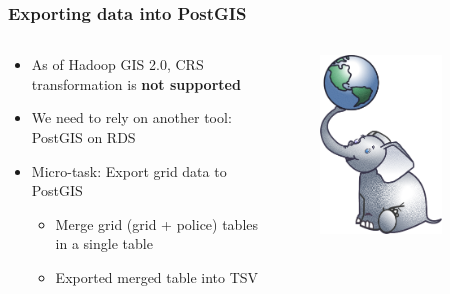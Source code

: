 \documentclass[hyperref={pdfpagelabels=true}]{beamer}
\begin{document}
\begin{frame}
\frametitle{Exporting data into PostGIS}
\begin{columns}
  \begin{column}{0.5\textwidth}
    \begin{itemize}
      \item<1->As of Hadoop GIS 2.0, CRS transformation is \textbf{not supported}
      \item<1->We need to rely on another tool: PostGIS on RDS  
      \item<1->Micro-task: Export grid data to PostGIS
      \begin{itemize}
	\item<2->Merge grid (grid + police) tables in a single table
	\item<3->Exported merged table into TSV
      \end{itemize}
    \end{itemize}
  \end{column}  
  \begin{column}{0.5\textwidth}
      \begin{figure}  
	\includegraphics[width=0.8\textwidth]{postgis.png}	
       \end{figure}  
  \end{column}  
\end{columns}        
\end{frame}
\end{document}
